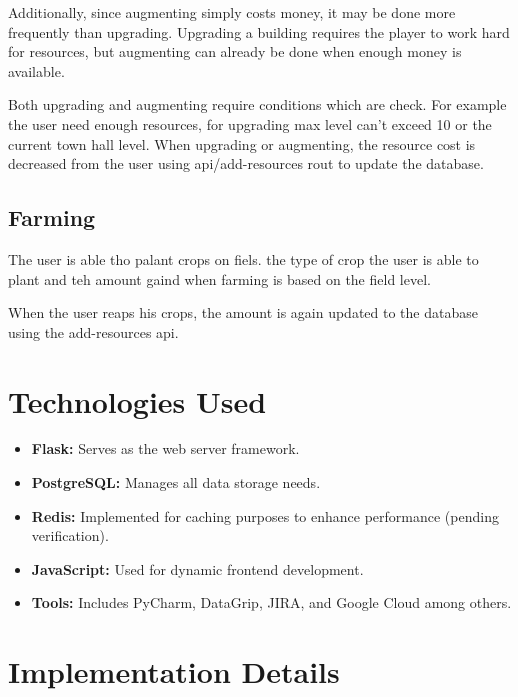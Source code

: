 \documentclass[12pt]{article}
\begin{document}
Additionally, since augmenting simply costs money, it may be done more frequently than upgrading.
Upgrading a building requires the player to work hard for resources, but augmenting can already be done when enough money is available.

Both upgrading and augmenting require conditions which are check. For example the user need enough resources, for upgrading max level can't exceed 10 or the current town hall level. When upgrading or augmenting, the resource cost is decreased from the user using api/add-resources rout to update the database.

\subsection{Farming}

The user is able tho palant crops on fiels. the type of crop the user is able to plant and teh amount gaind when farming is based on the field level.

When the user reaps his crops, the amount is again updated to the database using the add-resources api.

\section{Technologies Used}
\begin{itemize}
    \item \textbf{Flask:} Serves as the web server framework.
    \item \textbf{PostgreSQL:} Manages all data storage needs.
    \item \textbf{Redis:} Implemented for caching purposes to enhance performance (pending verification).
    \item \textbf{JavaScript:} Used for dynamic frontend development.
    \item \textbf{Tools:} Includes PyCharm, DataGrip, JIRA, and Google Cloud among others.
\end{itemize}

\section{Implementation Details}
\end{document}
